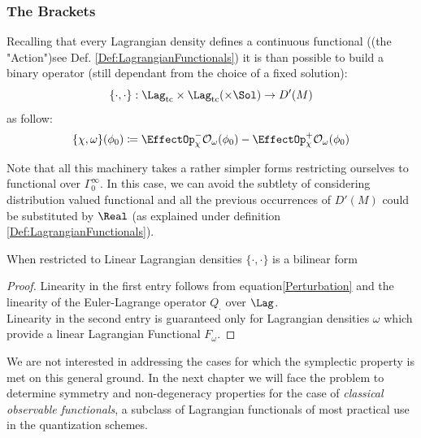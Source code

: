\documentclass[Main]{subfiles}
\begin{document}
		\subsubsection{The Brackets}
		Recalling that every Lagrangian density defines a continuous functional (\ifToninus (the "Action")\fi see Def. \ref{Def:LagrangianFunctionals}) it is than possible to build a binary operator (still dependant from the choice of a fixed solution):
		\begin{displaymath}
			\{\cdot,\cdot\}:\Lag_{\textrm{tc}} \times \Lag_{\textrm{tc}} ( \times \Sol )  \rightarrow D'(M)
		\end{displaymath}
		as follow:
		\begin{equation}\label{AbstractPeierlsBracket}
				\{\chi, \omega \}(\phi_0) \coloneqq \EffectOp_\chi^- \mathcal{O}_\omega (\phi_0) - \EffectOp_\chi^+ \mathcal{O}_\omega(\phi_0)
		\end{equation}
		
		\vspace{2mm}	
		Note that all this machinery takes a rather simpler forms restricting ourselves to functional over $\Gamma_0^\infty$. 
		In this case, we can avoid the subtlety of considering distribution valued functional and all the previous occurrences of $D'(M)$ could be substituted by $\Real$ (as explained under definition \ref{Def:LagrangianFunctionals}).

		\begin{proposition}[Bilinearity]
			When restricted to Linear Lagrangian densities $\{\cdot,\cdot\}$ is a bilinear form
		\end{proposition}
		\begin{proof}
			Linearity in the first entry follows from equation\ref{Perturbation} and the linearity of the Euler-Lagrange operator $Q_\cdot$ over $\Lag$.
			\\
			Linearity in the second entry is guaranteed only for Lagrangian densities $\omega$ which provide a linear Lagrangian Functional $F_\omega$.
		\end{proof}
		We are not interested in addressing the cases for which the symplectic property is met on this general ground. 
		In the next chapter we will face the problem to determine  symmetry and non-degeneracy properties for the case of  \emph{classical observable functionals}, a subclass of Lagrangian functionals of most practical use in the quantization schemes.
\end{document}
